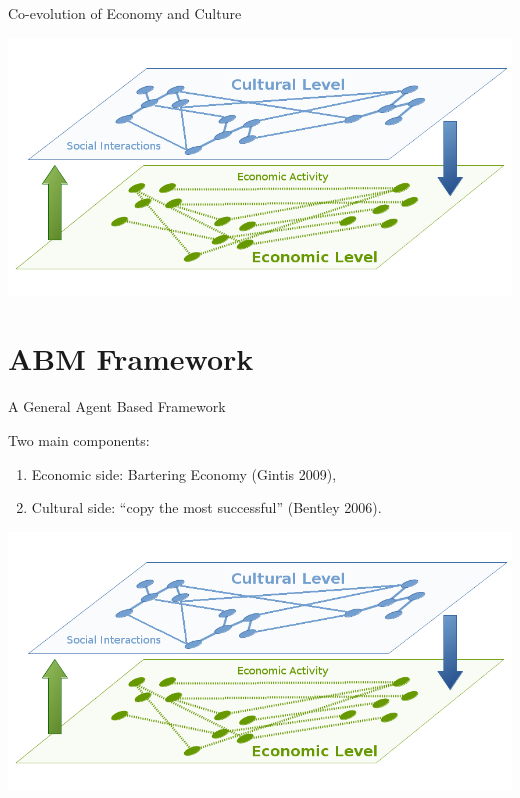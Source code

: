 \documentclass[12pt, handout=show,notes=show]{beamer}
\begin{document}
\begin{frame}{Co-evolution of Economy and Culture}

    \begin{center}
	\includegraphics[width=\textwidth]{images/interaction}	
    \end{center}

\end{frame}

\section{ABM Framework}




\begin{frame}{A General Agent Based Framework }

     Two main components:
     \vfill
    \begin{enumerate}
	\item Economic side: Bartering Economy (Gintis 2009),
	\item Cultural side: ``copy the most successful'' (Bentley 2006).
    \end{enumerate}
    \begin{center}
	\includegraphics[width=.8\textwidth]{images/interaction}	
    \end{center}
\end{frame}
	
\end{document}
